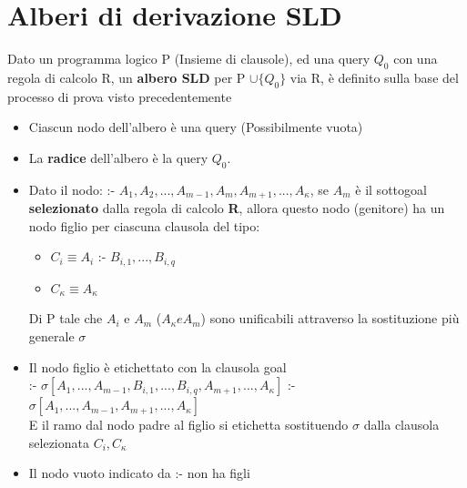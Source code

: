\documentclass[12pt, a4paper, openany, oneside]{book}
\begin{document}
{\section{Alberi di derivazione SLD}
Dato un programma logico P (Insieme di clausole), ed una query $Q_{0}$ con una 
regola di calcolo R, un \textbf{albero SLD} per P $\cup \{Q_{0}\}$ via R, è 
definito sulla base del processo di prova visto precedentemente
\begin{itemize}
	\item Ciascun nodo dell'albero è una query (Possibilmente vuota)
	\item La \textbf{radice} dell'albero è la query $Q_{0}$.
	\item Dato il nodo: :- $A_{1}, A_{2}, ..., A_{m-1}, A_{m}, A_{m+1}, ...,
	 A_{\kappa}$, se $A_{m}$ è il sottogoal \textbf{selezionato} dalla regola di
	 calcolo \textbf{R}, allora questo nodo (genitore) ha un nodo figlio per 
	 ciascuna clausola del tipo: \\
	 \begin{itemize}
	 	\item $C_{i} \equiv A_{i}$ :- $B_{i,1}, ..., B_{i,q}$
	 	\item $C_{\kappa} \equiv A_{\kappa}$
	 \end{itemize}
	 Di P tale che $A_{i}$ e $A_{m}$ ($A_{\kappa} e A_{m}$) sono unificabili 
	 attraverso la sostituzione più generale $\sigma$
	 \item Il nodo figlio è etichettato con la clausola goal \\
	 :- $\sigma[A_{1}, ..., A_{m-1}, B_{i,1}, ..., B_{i,q}, A_{m+1}, ..., A_{\kappa}]$
	 :- $\sigma[A_{1}, ..., A_{m-1}, A_{m+1}, ..., A_{\kappa}]$ \\
	 E il ramo dal nodo padre al figlio si etichetta sostituendo $\sigma$ dalla
	 clausola selezionata $C_{i}, C_{\kappa}$
	 \item Il nodo vuoto indicato da :- non ha figli
\end{itemize}
}
\end{document}
